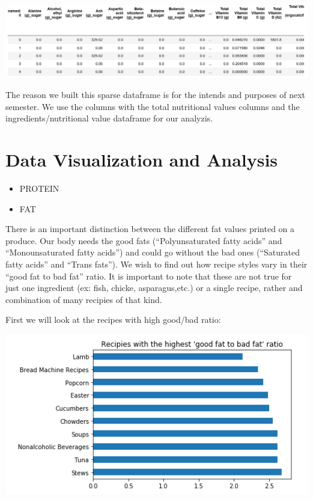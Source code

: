 \documentclass[11pt]{article}
\makeatletter
\def\maxwidth{\ifdim\Gin@nat@width>\linewidth\linewidth
    \else\Gin@nat@width\fi}
\let\Oldincludegraphics\includegraphics
\renewcommand{\includegraphics}[1]{\Oldincludegraphics[width=.8\maxwidth]{#1}}
\providecommand{\tightlist}{%
      \setlength{\itemsep}{0pt}\setlength{\parskip}{0pt}}
\makeatother
\begin{document}
\includegraphics{hefty_head.png}

The reason we built this sparse dataframe is for the intends and
purposes of next semester. We use the columns with the total nutritional
values columns and the ingredients/nutritional value dataframe for our
analyzis.

    \hypertarget{data-visualization-and-analysis}{%
\section{Data Visualization and
Analysis}\label{data-visualization-and-analysis}}

    \begin{itemize}
\tightlist
\item
  PROTEIN
\end{itemize}

    \begin{itemize}
\tightlist
\item
  FAT
\end{itemize}

    There is an important distinction between the different fat values
printed on a produce. Our body needs the good fats (``Polyunsaturated
fatty acids'' and ``Monounsaturated fatty acids'') and could go without
the bad ones (``Saturated fatty acids'' and ``Trans fats''). We wish to
find out how recipe styles vary in their ``good fat to bad fat'' ratio.
It is important to note that these are not true for just one ingredient
(ex: fish, chicke, asparagus,etc.) or a single recipe, rather and
combination of many recipies of that kind.

First we will look at the recipes with high good/bad ratio:

\includegraphics{goodbad1.png}
\end{document}
